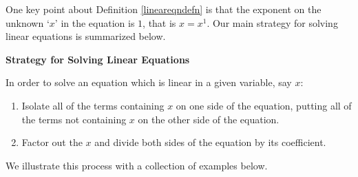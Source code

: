 \pagebreak

One key point about Definition \ref{lineareqndefn} is that the exponent on the unknown `$x$' in the equation is $1$, that is $x = x^1$. Our main strategy for solving linear equations is summarized below.

\medskip

 \label{strategyforsolvinglineareqns}

\colorbox{ResultColor}{\bbm

\centerline{\textbf{Strategy for Solving Linear Equations}}

\vspace{0.05in}

In order to solve an equation which is linear in a given variable, say $x$:

\vspace{-0.1in}

\begin{enumerate}

\item  Isolate all of the terms containing $x$ on one side of the equation, putting all of the terms not containing $x$ on the other side of the equation.

\item  Factor out the $x$ and divide both sides of the equation by its coefficient.

\end{enumerate}

\ebm}

\medskip

We illustrate this process with a collection of examples below.

